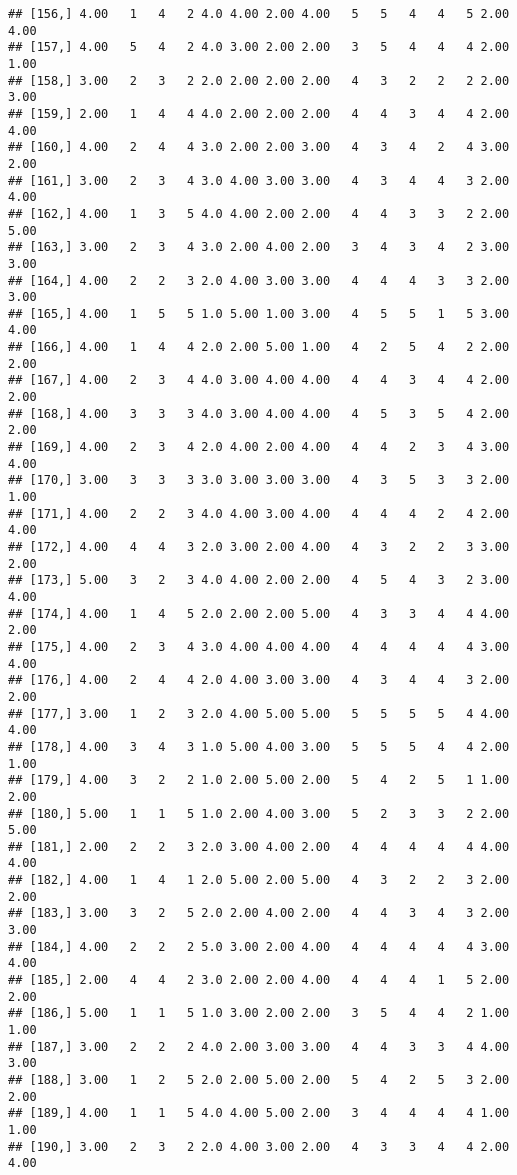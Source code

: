 \documentclass[]{article}
\begin{document}
\begin{verbatim}
## [156,] 4.00   1   4   2 4.0 4.00 2.00 4.00   5   5   4   4   5 2.00 4.00
## [157,] 4.00   5   4   2 4.0 3.00 2.00 2.00   3   5   4   4   4 2.00 1.00
## [158,] 3.00   2   3   2 2.0 2.00 2.00 2.00   4   3   2   2   2 2.00 3.00
## [159,] 2.00   1   4   4 4.0 2.00 2.00 2.00   4   4   3   4   4 2.00 4.00
## [160,] 4.00   2   4   4 3.0 2.00 2.00 3.00   4   3   4   2   4 3.00 2.00
## [161,] 3.00   2   3   4 3.0 4.00 3.00 3.00   4   3   4   4   3 2.00 4.00
## [162,] 4.00   1   3   5 4.0 4.00 2.00 2.00   4   4   3   3   2 2.00 5.00
## [163,] 3.00   2   3   4 3.0 2.00 4.00 2.00   3   4   3   4   2 3.00 3.00
## [164,] 4.00   2   2   3 2.0 4.00 3.00 3.00   4   4   4   3   3 2.00 3.00
## [165,] 4.00   1   5   5 1.0 5.00 1.00 3.00   4   5   5   1   5 3.00 4.00
## [166,] 4.00   1   4   4 2.0 2.00 5.00 1.00   4   2   5   4   2 2.00 2.00
## [167,] 4.00   2   3   4 4.0 3.00 4.00 4.00   4   4   3   4   4 2.00 2.00
## [168,] 4.00   3   3   3 4.0 3.00 4.00 4.00   4   5   3   5   4 2.00 2.00
## [169,] 4.00   2   3   4 2.0 4.00 2.00 4.00   4   4   2   3   4 3.00 4.00
## [170,] 3.00   3   3   3 3.0 3.00 3.00 3.00   4   3   5   3   3 2.00 1.00
## [171,] 4.00   2   2   3 4.0 4.00 3.00 4.00   4   4   4   2   4 2.00 4.00
## [172,] 4.00   4   4   3 2.0 3.00 2.00 4.00   4   3   2   2   3 3.00 2.00
## [173,] 5.00   3   2   3 4.0 4.00 2.00 2.00   4   5   4   3   2 3.00 4.00
## [174,] 4.00   1   4   5 2.0 2.00 2.00 5.00   4   3   3   4   4 4.00 2.00
## [175,] 4.00   2   3   4 3.0 4.00 4.00 4.00   4   4   4   4   4 3.00 4.00
## [176,] 4.00   2   4   4 2.0 4.00 3.00 3.00   4   3   4   4   3 2.00 2.00
## [177,] 3.00   1   2   3 2.0 4.00 5.00 5.00   5   5   5   5   4 4.00 4.00
## [178,] 4.00   3   4   3 1.0 5.00 4.00 3.00   5   5   5   4   4 2.00 1.00
## [179,] 4.00   3   2   2 1.0 2.00 5.00 2.00   5   4   2   5   1 1.00 2.00
## [180,] 5.00   1   1   5 1.0 2.00 4.00 3.00   5   2   3   3   2 2.00 5.00
## [181,] 2.00   2   2   3 2.0 3.00 4.00 2.00   4   4   4   4   4 4.00 4.00
## [182,] 4.00   1   4   1 2.0 5.00 2.00 5.00   4   3   2   2   3 2.00 2.00
## [183,] 3.00   3   2   5 2.0 2.00 4.00 2.00   4   4   3   4   3 2.00 3.00
## [184,] 4.00   2   2   2 5.0 3.00 2.00 4.00   4   4   4   4   4 3.00 4.00
## [185,] 2.00   4   4   2 3.0 2.00 2.00 4.00   4   4   4   1   5 2.00 2.00
## [186,] 5.00   1   1   5 1.0 3.00 2.00 2.00   3   5   4   4   2 1.00 1.00
## [187,] 3.00   2   2   2 4.0 2.00 3.00 3.00   4   4   3   3   4 4.00 3.00
## [188,] 3.00   1   2   5 2.0 2.00 5.00 2.00   5   4   2   5   3 2.00 2.00
## [189,] 4.00   1   1   5 4.0 4.00 5.00 2.00   3   4   4   4   4 1.00 1.00
## [190,] 3.00   2   3   2 2.0 4.00 3.00 2.00   4   3   3   4   4 2.00 4.00

\end{verbatim}
\end{document}
